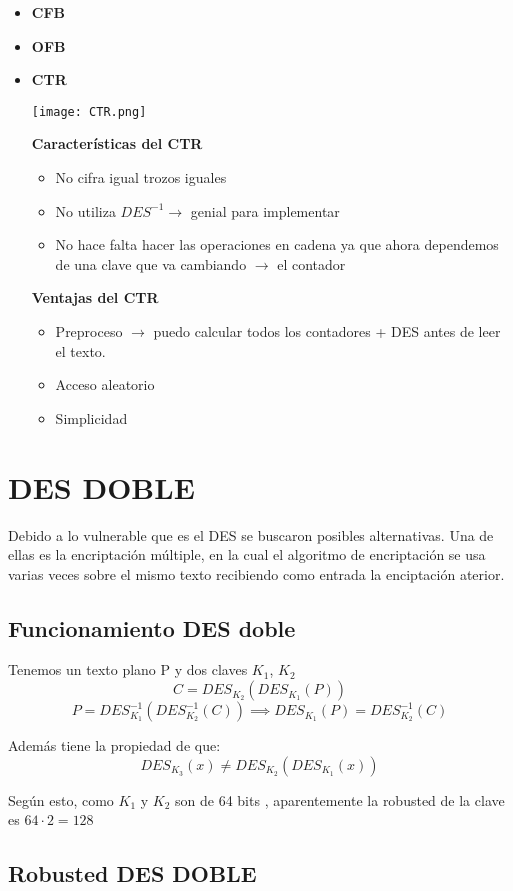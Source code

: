 \begin{itemize}
	\item \textbf{CFB}
	\item \textbf{OFB}
	\item \textbf{CTR}
	\begin{center}
		\texttt{[image: CTR.png]}
	\end{center}
	\textbf{Características del CTR}
	\begin{itemize}
		\item No cifra igual trozos iguales
		\item No utiliza $DES^{-1} \rightarrow$ genial para implementar
		\item No hace falta hacer las operaciones en cadena ya que ahora dependemos de una clave que va cambiando $\rightarrow $ el contador
	\end{itemize}
		\textbf{Ventajas del CTR}
		\begin{itemize}
			\item Preproceso $\rightarrow$ puedo calcular todos los contadores + DES antes de leer el texto. 
			\item Acceso aleatorio
			\item Simplicidad
		\end{itemize}
	
\end{itemize}

\chapter{DES DOBLE}
Debido a lo vulnerable que es el DES se buscaron posibles alternativas. Una de ellas es la encriptación múltiple, en la cual el algoritmo de encriptación se usa varias veces sobre el mismo texto recibiendo como entrada la enciptación aterior.

\section{Funcionamiento DES doble}
Tenemos un texto plano P y dos claves $K_1$, $K_2$
$$C= DES_{K_2}(DES_{K_1}(P))$$
$$P = DES^{-1}_{K_1}(DES^{-1}_{K_2}(C)) \implies DES_{K_1}(P) = DES^{-1}_{K_2}(C)$$

Además tiene la propiedad de que:
$$DES_{K_3}(x) \neq DES_{K_2}(DES_{K_1}(x))$$

Según esto, como $K_1$ y $K_2$ son de 64 bits , aparentemente la robusted de la clave es $64 \cdot 2 = 128$

\section{Robusted DES DOBLE}

